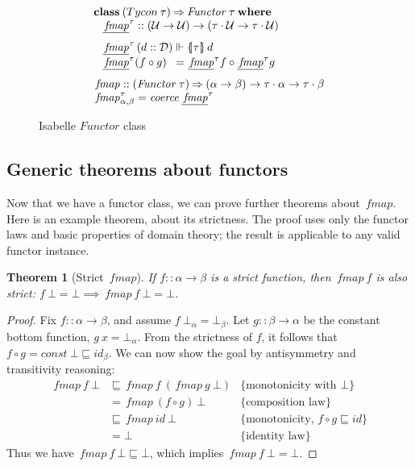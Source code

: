 \documentclass{sigplanconf}
\newcommand{\To}{\mathbin{\Rightarrow}}
\newcommand{\U}{\ensuremath{\mathcal{U}}}
\newcommand{\D}{\ensuremath{\mathcal{D}}}
\newcommand{\below}{\sqsubseteq}
\newcommand{\univ}[1]{\ensuremath{\underline{#1}}}
\newcommand{\symlbrace}{\mathopen{\lbrace\mkern-4.5mu\mid}}
\newcommand{\symrbrace}{\mathclose{\mid\mkern-4.5mu\rbrace}}
\newcommand{\TC}[1]{\ensuremath{\symlbrace#1\symrbrace}}
\newcommand{\kwd}[1]{\mathbf{#1}}
\newcommand{\hsc}[1]{\ensuremath{\mathit{#1}}}
\newcommand{\hsid}{\hsc{id}}
\newcommand{\hscoerce}{\hsc{coerce}}
\newcommand{\fmap}{\,\hsc{fmap}} %
\newcommand{\fmapU}{\univ{\fmap}}
\newcommand{\tA}{\alpha}
\newcommand{\tB}{\beta}
\newcommand{\tT}{\tau}
\newcommand{\isodefl}{\Vdash}
\newcommand{\justification}[1]{\{\text{#1}\}}
\newtheorem{theorem}{Theorem}
\theoremstyle{definition}
\begin{document}
\begin{figure}
\begin{align*}
  & \kwd{class}\:\hsc({Tycon}\:\tT) \To \hsc{Functor}\:\tT\:\kwd{where} \\[-\jot]
  & \hspace{8pt} \fmapU^\tT :: (\U \to \U) \to (\tT\cdot\U \to \tT\cdot\U) \\[\jot]
  & \hspace{8pt}
  \begin{alignedat}{2}
    & \fmapU^\tT\,(d::\D) &&\isodefl \TC{\tT}\,d \\[-\jot]
    & \fmapU^\tT (f \circ g) &&= \fmapU^\tT f \circ \fmapU^\tT g
  \end{alignedat}
  \\[\jot]
  & \fmap :: (\hsc{Functor}\:\tT) \To (\tA \to \tB) \to \tT\cdot\tA \to \tT\cdot\tB
  \\[-\jot]
  & \fmap^\tT_{\tA,\tB} = \hscoerce\:\fmapU^\tT
\end{align*}
\caption{Isabelle \hsc{Functor} class}
\label{fig:functor}
\end{figure}

\subsection{Generic theorems about functors}

Now that we have a functor class, we can prove further theorems about $\fmap$. Here is an example theorem, about its strictness. The proof uses only the functor laws and basic properties of domain theory; the result is applicable to any valid functor instance.

\begin{theorem}[Strict $\fmap$]
\label{thm:strict-fmap}
If $f::\tA\to\tB$ is a strict function, then $\fmap\:f$ is also strict: $f\:\bot = \bot \implies \fmap\:f\:\bot = \bot$.
\end{theorem}
%
\begin{proof}
Fix $f :: \tA\to\tB$, and assume $f\:\bot_\tA = \bot_\tB$. Let $g :: \tB\to\tA$ be the constant bottom function, $g\:x = \bot_\tA$. From the strict\-ness of $f$, it follows that $f \circ g = \hsc{const}\:\bot \below id_\tB$. We can now show the goal by antisymmetry and transitivity reasoning:
%
\begin{align*}
\fmap\:f\:\bot
&\below \fmap\:f\:(\fmap\:g\:\bot) & \justification{monotonicity with $\bot$} \\
&= \fmap\:(f \circ g)\:\bot & \justification{composition law} \\
&\below \fmap\:\hsid\:\bot & \justification{monotonicity, $f \circ g \below \hsid$} \\
&= \bot & \justification{identity law}
\end{align*}
%
Thus we have $\fmap\:f\:\bot \below \bot$, which implies $\fmap\:f\:\bot = \bot$.
\end{proof}
\end{document}
